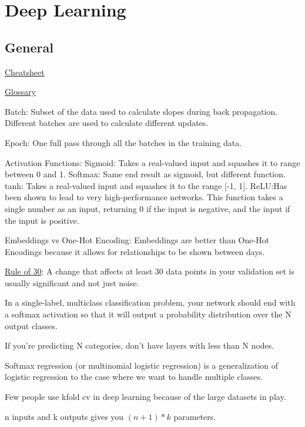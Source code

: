 \documentclass[]{book}
\begin{document}
\chapter{Deep Learning}\label{deep-learning}

\section{General}\label{general-9}

\href{https://stanford.edu/~shervine/teaching/cs-229/cheatsheet-deep-learning}{Cheatsheet}

\href{http://www.wildml.com/deep-learning-glossary/}{Glossary}

Batch: Subset of the data used to calculate slopes during back
propagation. Different batches are used to calculate different updates.

Epoch: One full pass through all the batches in the training data.

Activation Functions: Sigmoid: Takes a real-valued input and squashes it
to range between 0 and 1. Softmax: Same end result as sigmoid, but
different function. tanh: Takes a real-valued input and squashes it to
the range {[}-1, 1{]}. ReLU:Has been shown to lead to very
high-performance networks. This function takes a single number as an
input, returning 0 if the input is negative, and the input if the input
is positive.

Embeddings vs One-Hot Encoding: Embeddings are better than One-Hot
Encodings because it allows for relationships to be shown between days.

\href{https://www.youtube.com/watch?v=nqEYVzJLR_c\&feature=youtu.be\&t=31}{Rule
of 30}: A change that affects at least 30 data points in your validation
set is usually significant and not just noise.

In a single-label, multiclass classification problem, your network
should end with a softmax activation so that it will output a
probability distribution over the N output classes.

If you're predicting N categories, don't have layers with less than N
nodes.

Softmax regression (or multinomial logistic regression) is a
generalization of logistic regression to the case where we want to
handle multiple classes.

Few people use kfold cv in deep learning because of the large datasets
in play.

n inputs and k outputs gives you \((n+1)*k\) parameters.
\end{document}
